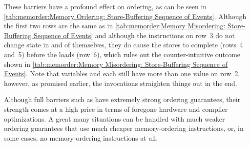 \begin{table}
\renewcommand*{\arraystretch}{1.1}
\small
\centering\OneColumnHSpace{-0.1in}
\caption{Memory Ordering:
			  Store-Buffering Sequence of Events}
\label{tab:memorder:Memory Ordering: Store-Buffering Sequence of Events}
\end{table}

These barriers have a profound effect on ordering, as can be seen in
\cref{tab:memorder:Memory Ordering: Store-Buffering Sequence of Events}.
Although the first two rows are the same as in
\cref{tab:memorder:Memory Misordering: Store-Buffering Sequence of Events}
and although the  instructions on row~3
do not change state
in and of themselves, they do cause the stores to complete
(rows~4 and~5) before the
loads (row~6), which rules out the counter-intuitive outcome shown in
\cref{tab:memorder:Memory Misordering: Store-Buffering Sequence of Events}.
Note that variables  and  each still have more than one
value on row~2, however, as promised earlier, the 
invocations straighten things out in the end.

Although full barriers such as  have extremely strong
ordering guarantees, their strength comes at a high price in terms
of foregone hardware and compiler optimizations.
A great many situations can be handled with much weaker ordering guarantees
that use much cheaper memory-ordering instructions, or, in some cases, no
memory-ordering instructions at all.

